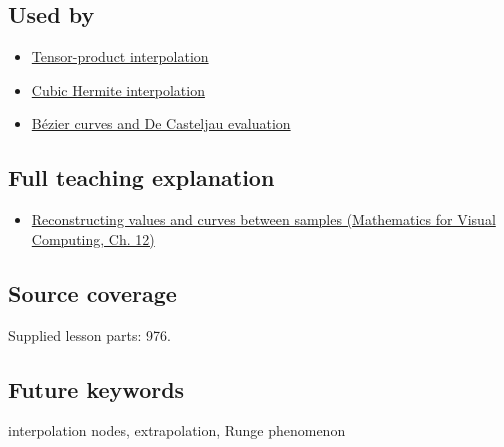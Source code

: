 \subsection{Used by}\label{appendix-0c2a5f69851e-used-by}

\hypertarget{appendix-0c2a5f69851e-used-by}{}

\begin{itemize}
\tightlist
\item
  \hyperref[appendix-0a09b6dfdc86]{Tensor-product interpolation}
\item
  \hyperref[appendix-db3aef8f2fd6]{Cubic Hermite interpolation}
\item
  \hyperref[appendix-ddbec701898c]{Bézier curves and De Casteljau evaluation}
\end{itemize}

\subsection{Full teaching explanation}\label{appendix-0c2a5f69851e-full-teaching-explanation}

\hypertarget{appendix-0c2a5f69851e-full-teaching-explanation}{}

\begin{itemize}
\tightlist
\item
  \href{../02-Mathematics-for-Visual-Computing/main.pdf\#nameddest=02-foundations-ii-ch028-reconstructing-values-and-curves-between-samples}{Reconstructing values and curves between samples (Mathematics for Visual Computing, Ch. 12)}
\end{itemize}

\subsection{Source coverage}\label{appendix-0c2a5f69851e-source-coverage}

\hypertarget{appendix-0c2a5f69851e-source-coverage}{}

Supplied lesson parts: 976.

\subsection{Future keywords}\label{appendix-0c2a5f69851e-future-keywords}

\hypertarget{appendix-0c2a5f69851e-future-keywords}{}

interpolation nodes, extrapolation, Runge phenomenon
